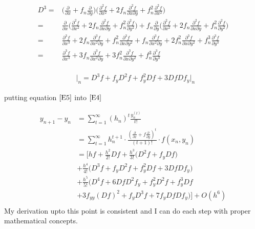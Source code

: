 \documentclass[12 pt]{article}
\begin{document}
{
\large
\begin{equation*}
\begin{split}
D^{3} =& \bigg(\frac{\partial }{\partial x} + f_{n}\frac{\partial }{\partial y}\bigg)\bigg(\frac{\partial^{2}f}{\partial x^{2}} + 2f_{n}\frac{\partial^{2}f}{\partial x \partial y} + f_{n}^{2}\frac{\partial^{2}f}{\partial x^{2}}\bigg)\\
	  =& \frac{\partial }{\partial x}\bigg(\frac{\partial^{2}f}{\partial x^{2}} + 2f_{n}\frac{\partial^{2}f}{\partial x \partial y} + f_{n}^{2}\frac{\partial^{2}f}{\partial y^{2}}\bigg) + f_{n}\frac{\partial }{\partial y}\bigg(\frac{\partial^{2}f}{\partial x^{2}} + 2f_{n}\frac{\partial^{2}f}{\partial x \partial y} + f_{n}^{2}\frac{\partial^{2}f}{\partial y^{2}}\bigg)\\
	  =& \frac{\partial^{3}f}{\partial x^{3}} + 2f_{n}\frac{\partial^{3}f}{\partial x^{2}\partial y} + f_{n}^{2}\frac{\partial^{3}f}{\partial x\partial y^{2}} + f_{n}\frac{\partial^{3}f}{\partial x^{2}\partial y} + 2f_{n}^{2}\frac{\partial^{3}f}{\partial x\partial y^{2}} + f_{n}^{3}\frac{\partial^{3}f}{\partial y^{3}}\\ 
	  =& \frac{\partial^{3}f}{\partial x^{3}} + 3f_{n}\frac{\partial^{3}f}{\partial x^{2}\partial y} + 3f_{n}^{2}\frac{\partial^{3}f}{\partial x\partial y^{2}} + f_{n}^{3}\frac{\partial^{3}f}{\partial y^{3}}\\
\end{split}
\end{equation*}
}

{
\Large
\begin{equation*}
\frac{\mathop{\mathrm{d^{3}f}}}{\mathop{\mathrm{dx^{3}}}}\Big\vert_{n} = D^{3}f + f_{y}D^{2}f + f_{y}^{2}Df + 3DfDf_{y}\Big\vert_{n}
\end{equation*}
}

putting equation $\ref{E5}$ into $\ref{E4}$ 

\begin{equation}\label{E6}
\begin{split}
y_{n+1}-y_{n} &= \sum_{t = 1}^{\infty}(h_{n})^{t}\frac{y_{n}^{(t)}}{t!}\\
			  &= \sum_{t = 1}^{\infty}h_{n}^{t+1}\cdot \frac{(\frac{\partial }{\partial x} +f\frac{\partial }{\partial y})^{t}}{(t+1)!}\cdot f(x_{n},y_{n})\\
			  &=\bigg[hf + \frac{h^{2}}{2!}Df + \frac{h^{3}}{3!}\bigg(D^{2}f+f_{y}Df\bigg)  \\
			  & + \frac{h^{4}}{4!}\bigg(D^{3}f + f_{y}D^{2}f + f_{y}^{2}Df + 3DfDf_{y}\bigg) \\
			  & + \frac{h^{5}}{5!}\bigg(D^{4}f+6DfD^{2}f_{y} + f_{y}^{2}D^{2}f + f_{y}^{3}Df \\
			  & + 3f_{yy}(Df)^{2} + f_{y}D^{3}f + 7f_{y}DfDf_{y}\bigg)\bigg] + O(h^{6})\\
\end{split}
\end{equation}
{
	\color{red}
	\large
My derivation upto this point is consistent and I can do each step with proper mathematical concepts.
}
\end{document}
